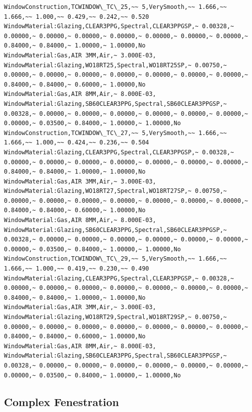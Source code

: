 \begin{lstlisting}
WindowConstruction,TCWINDOW\_TC\_25,~~ 5,VerySmooth,~~ 1.666,~~ 1.666,~~ 1.000,~~ 0.429,~~ 0.242,~~ 0.520
WindowMaterial:Glazing,CLEAR3PPG,Spectral,CLEAR3PPGSP,~ 0.00328,~ 0.00000,~ 0.00000,~ 0.00000,~ 0.00000,~ 0.00000,~ 0.00000,~ 0.00000,~ 0.84000,~ 0.84000,~ 1.00000,~ 1.00000,No
WindowMaterial:Gas,AIR 3MM,Air,~ 3.000E-03,
WindowMaterial:Glazing,WO18RT25,Spectral,WO18RT25SP,~ 0.00750,~ 0.00000,~ 0.00000,~ 0.00000,~ 0.00000,~ 0.00000,~ 0.00000,~ 0.00000,~ 0.84000,~ 0.84000,~ 0.60000,~ 1.00000,No
WindowMaterial:Gas,AIR 8MM,Air,~ 8.000E-03,
WindowMaterial:Glazing,SB60CLEAR3PPG,Spectral,SB60CLEAR3PPGSP,~ 0.00328,~ 0.00000,~ 0.00000,~ 0.00000,~ 0.00000,~ 0.00000,~ 0.00000,~ 0.00000,~ 0.03500,~ 0.84000,~ 1.00000,~ 1.00000,No
WindowConstruction,TCWINDOW\_TC\_27,~~ 5,VerySmooth,~~ 1.666,~~ 1.666,~~ 1.000,~~ 0.424,~~ 0.236,~~ 0.504
WindowMaterial:Glazing,CLEAR3PPG,Spectral,CLEAR3PPGSP,~ 0.00328,~ 0.00000,~ 0.00000,~ 0.00000,~ 0.00000,~ 0.00000,~ 0.00000,~ 0.00000,~ 0.84000,~ 0.84000,~ 1.00000,~ 1.00000,No
WindowMaterial:Gas,AIR 3MM,Air,~ 3.000E-03,
WindowMaterial:Glazing,WO18RT27,Spectral,WO18RT27SP,~ 0.00750,~ 0.00000,~ 0.00000,~ 0.00000,~ 0.00000,~ 0.00000,~ 0.00000,~ 0.00000,~ 0.84000,~ 0.84000,~ 0.60000,~ 1.00000,No
WindowMaterial:Gas,AIR 8MM,Air,~ 8.000E-03,
WindowMaterial:Glazing,SB60CLEAR3PPG,Spectral,SB60CLEAR3PPGSP,~ 0.00328,~ 0.00000,~ 0.00000,~ 0.00000,~ 0.00000,~ 0.00000,~ 0.00000,~ 0.00000,~ 0.03500,~ 0.84000,~ 1.00000,~ 1.00000,No
WindowConstruction,TCWINDOW\_TC\_29,~~ 5,VerySmooth,~~ 1.666,~~ 1.666,~~ 1.000,~~ 0.419,~~ 0.230,~~ 0.490
WindowMaterial:Glazing,CLEAR3PPG,Spectral,CLEAR3PPGSP,~ 0.00328,~ 0.00000,~ 0.00000,~ 0.00000,~ 0.00000,~ 0.00000,~ 0.00000,~ 0.00000,~ 0.84000,~ 0.84000,~ 1.00000,~ 1.00000,No
WindowMaterial:Gas,AIR 3MM,Air,~ 3.000E-03,
WindowMaterial:Glazing,WO18RT29,Spectral,WO18RT29SP,~ 0.00750,~ 0.00000,~ 0.00000,~ 0.00000,~ 0.00000,~ 0.00000,~ 0.00000,~ 0.00000,~ 0.84000,~ 0.84000,~ 0.60000,~ 1.00000,No
WindowMaterial:Gas,AIR 8MM,Air,~ 8.000E-03,
WindowMaterial:Glazing,SB60CLEAR3PPG,Spectral,SB60CLEAR3PPGSP,~ 0.00328,~ 0.00000,~ 0.00000,~ 0.00000,~ 0.00000,~ 0.00000,~ 0.00000,~ 0.00000,~ 0.03500,~ 0.84000,~ 1.00000,~ 1.00000,No
\end{lstlisting}

\subsection{Complex Fenestration}\label{complex-fenestration}

